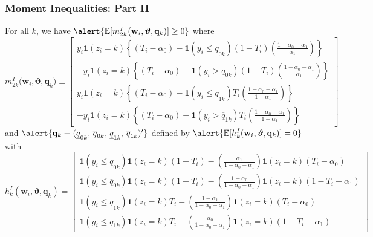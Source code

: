 \documentclass{beamer}
\begin{document}
\begin{frame}
  \frametitle{Moment Inequalities: Part II}

  \scriptsize

  For all $k$, we have $\alert{\mathbb{E}[m_{2k}^I\big(\mathbf{w}_i, \boldsymbol{\vartheta}, \mathbf{q}_k)]\geq 0}$ where
\[
  m_{2k}^I\big(\mathbf{w}_i, \boldsymbol{\vartheta}, \mathbf{q}_k) \equiv \left[
  \begin{array}{r}
    y_i \mathbf{1}\left( z_i=k \right)\left\{(T_i - \alpha_0) - \mathbf{1}(y_i \leq \underline{q}_{0k})  (1 - T_i)\left( \frac{1 - \alpha_0 - \alpha_1}{\alpha_1} \right)\right\} \\
    - y_i \mathbf{1}(z_i=k) \left\{ (T_i - \alpha_0) -  \mathbf{1}(y_i > \overline{q}_{0k}) (1 - T_i) \left( \frac{1 - \alpha_0 - \alpha_1}{\alpha_1} \right) \right\} \\
    y_i \mathbf{1}\left( z_i=k \right)\left\{(T_i - \alpha_0) - \mathbf{1}(y_i \leq \underline{q}_{1k})  T_i\left( \frac{1 - \alpha_0 - \alpha_1}{1 - \alpha_1} \right)\right\} \\
    - y_i \mathbf{1}(z_i=k) \left\{ (T_i - \alpha_0) -  \mathbf{1}(y_i > \overline{q}_{1k}) T_i \left( \frac{1 - \alpha_0 - \alpha_1}{1 - \alpha_1} \right) \right\} 
\end{array}
\right] 
\]
and $\alert{\mathbf{q}_k \equiv ( \underline{q}_{0k},\, \overline{q}_{0k},\, \underline{q}_{1k}, \,\overline{q}_{1k})'}$ defined by $\alert{\mathbb{E}[h_k^I(\mathbf{w}_i,\boldsymbol{\vartheta},\mathbf{q}_k)]=0}$ with
\[
  h_k^I(\mathbf{w}_i,\boldsymbol{\vartheta},\mathbf{q}_k) = \left[
  \begin{array}{l}
    \mathbf{1}(y_i \leq \underline{q}_{0k}) \mathbf{1}(z_i=k)(1 - T_i) 
    - \left( \frac{\alpha_1}{1 - \alpha_0 - \alpha_1} \right) \mathbf{1}(z_i=k)(T_i-\alpha_0)\\ 
    \mathbf{1}(y_i \leq \overline{q}_{0k}) \mathbf{1}(z_i=k)(1 - T_i)
    - \left( \frac{1 - \alpha_0}{1 - \alpha_0 - \alpha_1} \right) \mathbf{1}(z_i=k)(1 - T_i-\alpha_1)\\
    \mathbf{1}(y_i \leq \underline{q}_{1k}) \mathbf{1}(z_i=k)T_i
    - \left( \frac{1 - \alpha_1}{1 - \alpha_0 - \alpha_1} \right) \mathbf{1}(z_i=k)(T_i-\alpha_0)\\ 
    \mathbf{1}(y_i \leq \overline{q}_{1k}) \mathbf{1}(z_i=k)T_i 
    - \left( \frac{\alpha_0}{1 - \alpha_0 - \alpha_1} \right) \mathbf{1}(z_i=k)(1 - T_i-\alpha_1)
  \end{array}
\right]
\]

\end{frame}
\end{document}
